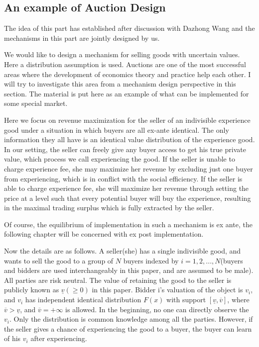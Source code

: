 \subsection{An example of Auction Design}
The idea of this part has established after discussion with Dazhong Wang and the mechanisms in this part are jointly designed by us.

We would like to design a mechanism for selling goods with  uncertain values.
Here a distribution assumption is used. Auctions are one of the most successful areas where the development of economics
theory and practice help each other. I will try to investigate this area from
a mechanism design perspective in this section. The material is put here as an example of what can be implemented for some special market. 

Here we focus on revenue maximization for the seller of an indivisible experience
good under a situation in which buyers are all ex-ante identical. The only information they all have is an identical
value distribution of the experience good. In our
setting, the seller can freely give any buyer access to get his true private value, which process we call experiencing the good. If the seller is
unable to charge experience fee, she may maximize her revenue by excluding just one buyer from experiencing, which is in conflict with the social efficiency. If
the seller is able to charge experience fee, she will maximize her revenue through setting
the price at a level such that every potential buyer will buy the experience, 
resulting in the maximal trading surplus which is fully extracted by the seller.

Of course, the equilibrium of implementation in such a mechanism is ex ante,  the following chapter will be concerned with ex post implementation.

Now the details are as follows. A seller(she) has a single indivisible good, and wants to sell the good to a group of $N$ buyers indexed by $i=1, 2, . . . , N$(buyers and
bidders are used interchangeably in this paper, and are assumed to be
male). All parties are risk neutral. 
 The value of retaining the good to the seller
is publicly known as $\underline{v}(\geq 0)$ in this paper. Bidder i's valuation of the object
is $v_{i}$, and $v_{i}$ has independent identical distribution $F(x)$ with support $[\underline{v}, \overline{v}]$, 
where $\overline{v}>\underline{v}$, and $\overline{v}=+\infty$ is allowed. 
In the beginning, no one can directly observe the $v_{i}$. Only the distribution is common knowledge among all the parties. However, if the seller gives a chance of experiencing the good to a buyer, the buyer can learn of his $v_{i}$ after experiencing. 
 

